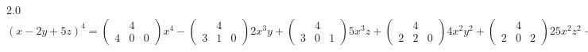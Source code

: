 \documentclass[12pt]{article}
\begin{document}
\begin{spacing}{2.0}
$(x-2y+5z)^4 = \left(
\begin{array}{ccc}
  & 4 & \\
4 & 0 & 0
\end{array}
\right) x^4 - \left(
\begin{array}{ccc}
  & 4 & \\
3 & 1 & 0
\end{array}
\right) 2x^3y + \left(
\begin{array}{ccc}
  & 4 & \\
3 & 0 & 1
\end{array}
\right) 5x^3z + \left(
\begin{array}{ccc}
  & 4 & \\
2 & 2 & 0
\end{array}
\right) 4x^2y^2 + \left(
\begin{array}{ccc}
  & 4 & \\
2 & 0 & 2
\end{array}
\right) 25x^2z^2 - \left(
\begin{array}{ccc}
  & 4 & \\
2 & 1 & 1
\end{array}
\right) 10x^2yz - \left(
\begin{array}{ccc}
  & 4 & \\
1 & 3 & 0
\end{array}
\right) 8xy^3 + \left(
\begin{array}{ccc}
  & 4 & \\
1 & 0 & 3
\end{array}
\right)125xz^3 + \left(
\begin{array}{ccc}
  & 4 & \\
1 & 2 & 1
\end{array}
\right) 20xy^2z - \left(
\begin{array}{ccc}
  & 4 & \\
1 & 1 & 2
\end{array}
\right) 50xyz^2 + \left(
\begin{array}{ccc}
  & 4 & \\
0 & 4 & 0
\end{array}
\right)16y^4 + \left(
\begin{array}{ccc}
  & 4 & \\
0 & 0 & 4
\end{array}
\right) 625z^4 - \left(
\begin{array}{ccc}
  & 4 & \\
0 & 3 & 1
\end{array}
\right) 40y^3z - \left(
\begin{array}{ccc}
  & 4 & \\
0 & 1 & 3
\end{array}
\right) 250yz^3 + \left(
\begin{array}{ccc}
  & 4 & \\
0 & 2 & 2
\end{array}
\right)100y^2z^2 = x^4-8 x^3 y+20 x^3 z+24 x^2 y^2-120 x^2 y z+150 x^2 z^2-32 x y^3+240 x y^2 z-600
   x y z^2+500 x z^3+16 y^4-160 y^3 z+600 y^2 z^2-1000 y z^3+625 z^4$


\end{spacing}
\end{document}
